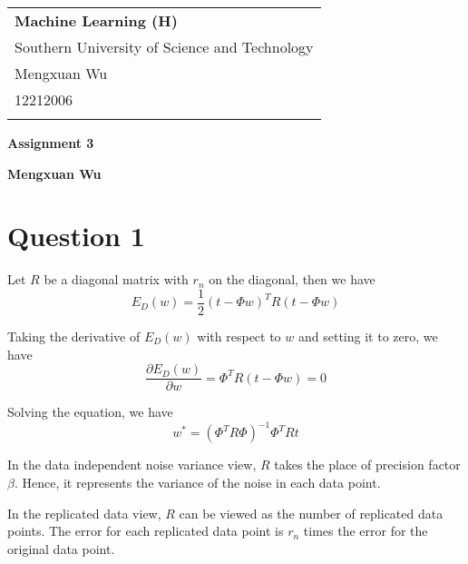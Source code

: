 \documentclass[a4paper,12pt]{article}
\newcommand{\pard}[2]{\frac{\partial #1}{\partial #2}}
\begin{document}
\thispagestyle{empty} %

\begin{tabular}{p{15.5cm}}
{\large \bf Machine Learning (H)} \\
Southern University of Science and Technology \\ Mengxuan Wu \\ 12212006 \\
\hline
\\
\end{tabular}

\vspace*{0.3cm} %

\begin{center}
	{\Large \bf Assignment 3}
	\vspace{2mm}

	{\bf Mengxuan Wu}
		
\end{center}  

\vspace{0.4cm}

\section*{Question 1}

Let $R$ be a diagonal matrix with $r_n$ on the diagonal, then we have
\begin{equation*}
	E_D(w) = \frac{1}{2} (t-\Phi w)^T R (t-\Phi w)
\end{equation*}

Taking the derivative of $E_D(w)$ with respect to $w$ and setting it to zero, we have
\begin{equation*}
	\pard{E_D(w)}{w} = \Phi^T R (t-\Phi w) = 0
\end{equation*}

Solving the equation, we have
\begin{equation*}
	w^* = (\Phi^T R \Phi)^{-1} \Phi^T R t
\end{equation*}

In the data independent noise variance view, $R$ takes the place of precision factor $\beta$.
Hence, it represents the variance of the noise in each data point.

In the replicated data view, $R$ can be viewed as the number of replicated data points. 
The error for each replicated data point is $r_n$ times the error for the original data point.
\end{document}
